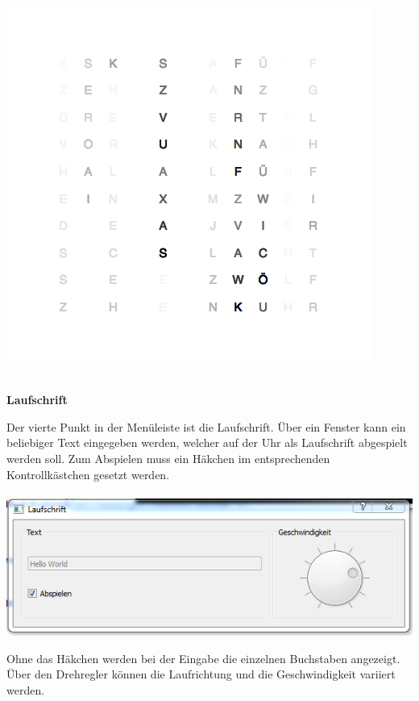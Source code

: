 \begin{multicols}{2}
{
    \centering
    \includegraphics[width=\columnwidth]{Abbildungen/Software/Demo/Matrix}

}
\ \\
\textbf{Laufschrift}

Der vierte Punkt in der Menüleiste ist die Laufschrift. Über ein Fenster kann ein beliebiger Text eingegeben werden, welcher auf der Uhr als Laufschrift abgespielt werden soll. Zum Abspielen muss ein Häkchen im entsprechenden Kontrollkästchen gesetzt werden. \\
\\
{
    \centering
    \includegraphics[width=1\columnwidth]{Abbildungen/Software/Laufschrift02}
}

Ohne das Häkchen werden bei der Eingabe die einzelnen Buchstaben angezeigt. Über den Drehregler können die Laufrichtung und die Geschwindigkeit variiert werden.


\end{multicols}


